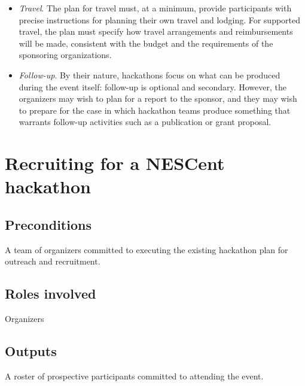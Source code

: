 \documentclass[11pt]{article}
\begin{document}
\begin{itemize}
\begin{itemize}
\item	{\em Travel}. The plan for travel must, at a minimum, provide participants with precise instructions for planning their own travel and lodging. For supported travel, the plan must specify how travel arrangements and reimbursements will be made, consistent with the budget and the requirements of the sponsoring organizations.  
\item	{\em Follow-up}. By their nature, hackathons focus on what can be produced during the event itself: follow-up is optional and secondary. However, the organizers may wish to plan for a report to the sponsor, and they may wish to prepare for the case in which hackathon teams produce something that warrants follow-up activities such as a publication or grant proposal.  
\end{itemize}
\end{itemize}

\newpage
\section{Recruiting for a NESCent hackathon}
\subsection{Preconditions}
A team of organizers committed to executing the existing hackathon plan for outreach and recruitment. 
\subsection{Roles involved}
Organizers
\subsection{Outputs}
A roster of prospective participants committed to attending the event. 
\end{document}
